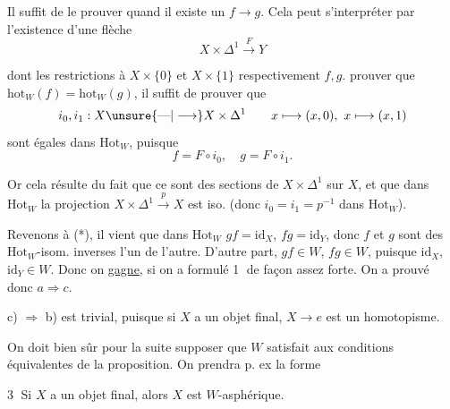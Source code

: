 Il suffit de le prouver quand il existe un  $f\longrightarrow g$. Cela peut s'interpréter par l'existence d'une flèche
\[
X\times\Delta^1\xrightarrow{F}Y
\]

dont les restrictions à $X\times\{0\}$ et $X\times\{1\}$ respectivement  $f,g$.  prouver que $\mathrm{hot}_W(f)=\mathrm{hot}_W(g)$, il suffit de prouver que
\[
i_0,i_1:X\unsure{\text{---}|\longrightarrow}X\times\Delta^1
\qquad x\longmapsto(x,0),\ x\longmapsto(x,1)
\]
sont égales dans $\mathrm{Hot}_W$, puisque
\[
f=F\circ i_0,\quad g=F\circ i_1.
\]

Or cela résulte du fait que ce sont des sections de $X\times\Delta^1$ sur $X$, et que dans $\mathrm{Hot}_W$ la projection $X\times\Delta^1\xrightarrow{p}X$ est iso. (donc $i_0=i_1=p^{-1}$ dans $\mathrm{Hot}_W$).



Revenons à (*), il vient que dans $\mathrm{Hot}_W$ $gf=\mathrm{id}_X$, $fg=\mathrm{id}_Y$, donc $f$ et $g$ sont des $\mathrm{Hot}_W$-isom. inverses l'un de l'autre.  D'autre part, $gf\in W$, $fg\in W$,  puisque $\mathrm{id}_X$, $\mathrm{id}_Y\in W$. Donc on \uline{gagne}, si on a formulé \textcircled{1} de façon assez forte. On a prouvé donc $a\Rightarrow c$.

c) $\Rightarrow$ b) est trivial, puisque si $X$ a un objet final, $X\longrightarrow e$ est un homotopisme.


On doit bien sûr pour la suite supposer que $W$ satisfait aux conditions équivalentes de la proposition. On prendra p. ex la forme


\textcircled{3} Si $X$ a un objet final, alors $X$ est $W$-asphérique.

